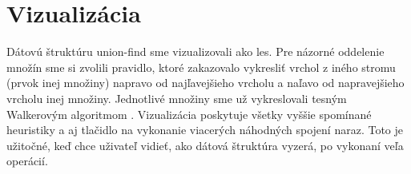 \begin{table}
\centering
\small
\qquad
{}
\caption{\normalsize Porovnanie časových zložitostí pre rôzne kombinácie hľadaní prvkov a 
spájaní množín pre union-find. Počet prvkov je $n$ a počet operácií je $m$. 
Ackermannova inverzná funkcia je označená ako $\alpha$. V praxi zväčša platí, že $m > n$.}
\label{fig:uf:comp}
\end{table}

\section{Vizualizácia}
Dátovú štruktúru union-find sme vizualizovali ako les. Pre názorné 
oddelenie množín sme si zvolili pravidlo, ktoré zakazovalo vykresliť vrchol 
z iného stromu (prvok inej množiny) 
napravo od najľavejšieho vrcholu a naľavo od napravejšieho vrcholu inej 
množiny. Jednotlivé množiny sme už vykreslovali tesným Walkerovým algoritmom 
\citep{walker}. Vizualizácia poskytuje všetky vyššie spomínané heuristiky a 
aj tlačidlo na vykonanie viacerých náhodných spojení naraz. Toto je užitočné, 
keď chce uživateľ vidieť, ako dátová štruktúra vyzerá, po vykonaní 
veľa operácií.


